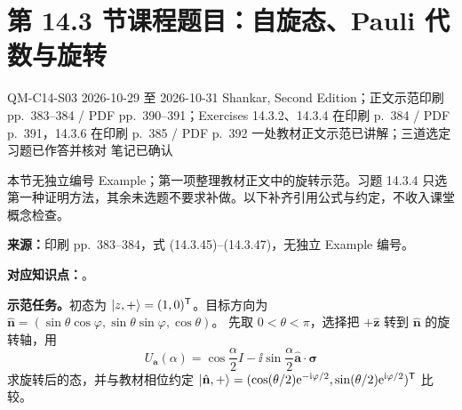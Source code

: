 \section{第 14.3 节课程题目：自旋态、Pauli 代数与旋转}
\label{exercises:QM-C14-S03}
\exercisemeta
  {QM-C14-S03}
  {2026-10-29 至 2026-10-31}
  {Shankar, Second Edition；正文示范印刷 pp.~383--384 / PDF pp.~390--391；Exercises 14.3.2、14.3.4 在印刷 p.~384 / PDF p.~391，14.3.6 在印刷 p.~385 / PDF p.~392}
  {一处教材正文示范已讲解；三道选定习题已作答并核对}
  {笔记已确认}

本节无独立编号 Example；第一项整理教材正文中的旋转示范。习题 14.3.4 只选第一种证明方法，其余未选题不要求补做。以下补齐引用公式与约定，不收入课堂概念检查。

\textbf{来源：}印刷 pp.~383--384，式 (14.3.45)--(14.3.47)，无独立 Example 编号。

\textbf{对应知识点：}。

\textbf{示范任务。}初态为 $\left|z,+\right\rangle=(1,0)^{\mathsf T}$。目标方向为
$\hat{\mathbf n}=(\sin\theta\cos\varphi,\sin\theta\sin\varphi,\cos\theta)$。
先取 $0<\theta<\pi$，选择把 $+\hat{\mathbf z}$ 转到 $\hat{\mathbf n}$ 的旋转轴，用
\begin{equation}
  U_{\mathbf a}(\alpha)=\cos\frac\alpha2 I
    -\ii\sin\frac\alpha2\hat{\mathbf a}\cdot\boldsymbol\sigma
\end{equation}
求旋转后的态，并与教材相位约定
$\left|\hat{\mathbf n},+\right\rangle=(\cos(\theta/2)\mathrm{e}^{-\mathrm{i}\varphi/2},
\sin(\theta/2)\mathrm{e}^{\mathrm{i}\varphi/2})^{\mathsf T}$ 比较。

